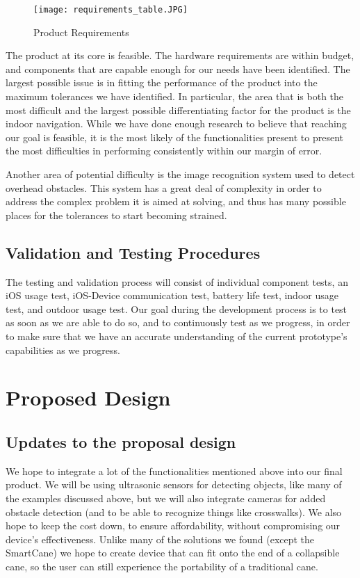 \documentclass[letterpaper,12pt]{article}
\begin{document}
\begin{figure}[h]
\centering
\caption{Product Requirements}
\texttt{[image: requirements\_table.JPG]}
\end{figure}

The product at its core is feasible. The hardware requirements are within budget, and components that are capable enough for our needs have been identified. The largest possible issue is in fitting the performance of the product into the maximum tolerances we have identified. In particular, the area that is both the most difficult and the largest possible differentiating factor for the product is the indoor navigation. While we have done enough research to believe that reaching our goal is feasible, it is the most likely of the functionalities present to present the most difficulties in performing consistently within our margin of error.\par

Another area of potential difficulty is the image recognition system used to detect overhead obstacles. This system has a great deal of complexity in order to address the complex problem it is aimed at solving, and thus has many possible places for the tolerances to start becoming strained.\par

\subsection{Validation and Testing Procedures}
The testing and validation process will consist of individual component tests, an iOS usage test, iOS-Device communication test, battery life test, indoor usage test, and outdoor usage test. Our goal during the development process is to test as soon as we are able to do so, and to continuously test as we progress, in order to make sure that we have an accurate understanding of the current prototype's capabilities as we progress.

\section{Proposed Design}

\subsection {Updates to the proposal design}

We hope to integrate a lot of the functionalities mentioned above into our final product. We will be using ultrasonic sensors for detecting objects, like many of the examples discussed above, but we will also integrate cameras for added obstacle detection (and to be able to recognize things like crosswalks). We also hope to keep the cost down, to ensure affordability, without compromising our device’s effectiveness. Unlike many of the solutions we found (except the SmartCane) we hope to create device that can fit onto the end of a collapsible cane, so the user can still experience the portability of a traditional cane.
\end{document}
